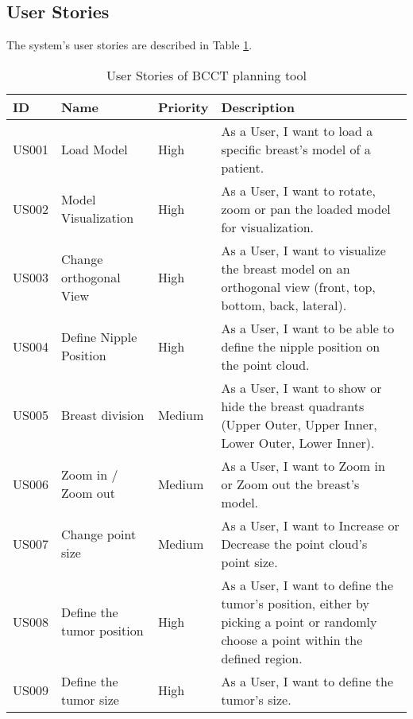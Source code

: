 \subsection{User Stories}

The system's user stories are described in Table \ref{tab:user stories}.

\begin{longtable}{|l|p{30mm}|l|p{90mm}|}
\caption{User Stories of BCCT planning tool}\label{tab:user stories}\\
\hline
\textbf{ID} & \textbf{Name} & \textbf{Priority} & \textbf{Description} \\
\hline
\hline
\endhead
\hline
\endfoot
US001       & Load Model             & High                 & As a User, I want to load a specific breast's model of a patient.                    \\ \hline
US002       & Model Visualization             & High                 & As a User, I want to rotate, zoom or pan the loaded model for visualization.                   \\ \hline
US003       & Change orthogonal View             & High                 & As a User, I want to visualize the breast model on an orthogonal view (front, top, bottom, back, lateral).                    \\ \hline
US004       & Define Nipple Position             & High                 & As a User, I want to be able to define the nipple position on the point cloud.                   \\ \hline
US005       & Breast division             & Medium                 & As a User, I want to show or hide the breast quadrants (Upper Outer, Upper Inner, Lower Outer, Lower Inner).                    \\ \hline
US006       & Zoom in / Zoom out             & Medium                 & As a User, I want to Zoom in or Zoom out the breast's model.                   \\ \hline
US007       & Change point size             & Medium                 & As a User, I want to Increase or Decrease the point cloud's point size.                   \\ \hline
US008       & Define the tumor position             & High                 & As a User, I want to define the tumor's position, either by picking a point or randomly choose a point within the defined region.                  \\ \hline
US009       & Define the tumor size             & High                 & As a User, I want to define the tumor's size.                   \\ \hline

\end{longtable}

